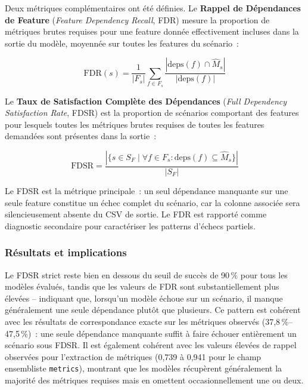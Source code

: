 Deux métriques complémentaires ont été définies. Le \textbf{Rappel de Dépendances de Feature}
(\textit{Feature Dependency Recall}, FDR) mesure la proportion de métriques brutes requises pour
une feature donnée effectivement incluses dans la sortie du modèle, moyennée sur toutes les
features du scénario~:

\begin{equation}
\mathrm{FDR}(s) = \frac{1}{|F_s|} \sum_{f \in F_s}
\frac{|\mathrm{deps}(f) \cap \hat{M}_s|}{|\mathrm{deps}(f)|}
\end{equation}

Le \textbf{Taux de Satisfaction Complète des Dépendances} (\textit{Full Dependency Satisfaction
Rate}, FDSR) est la proportion de scénarios comportant des features pour lesquels toutes les
métriques brutes requises de toutes les features demandées sont présentes dans la sortie~:

\begin{equation}
\mathrm{FDSR} = \frac{|\{ s \in S_F \mid \forall f \in F_s :
\mathrm{deps}(f) \subseteq \hat{M}_s \}|}{|S_F|}
\end{equation}

Le FDSR est la métrique principale~: un seul dépendance manquante sur une seule feature constitue
un échec complet du scénario, car la colonne associée sera silencieusement absente du CSV de
sortie. Le FDR est rapporté comme diagnostic secondaire pour caractériser les patterns d'échecs
partiels.

\subsubsection{Résultats et implications}

Le FDSR strict reste bien en dessous du seuil de succès de 90\,\% pour tous les modèles évalués,
tandis que les valeurs de FDR sont substantiellement plus élevées -- indiquant que, lorsqu'un
modèle échoue sur un scénario, il manque généralement une seule dépendance plutôt que plusieurs.
Ce pattern est cohérent avec les résultats de correspondance exacte sur les métriques observés
(37,8\,\%--47,5\,\%)~: une seule dépendance manquante suffit à faire échouer entièrement un
scénario sous FDSR. Il est également cohérent avec les valeurs élevées de rappel observées pour
l'extraction de métriques (0,739 à 0,941 pour le champ ensembliste \texttt{metrics}), montrant
que les modèles récupèrent généralement la majorité des métriques requises mais en omettent
occasionnellement une ou deux.

